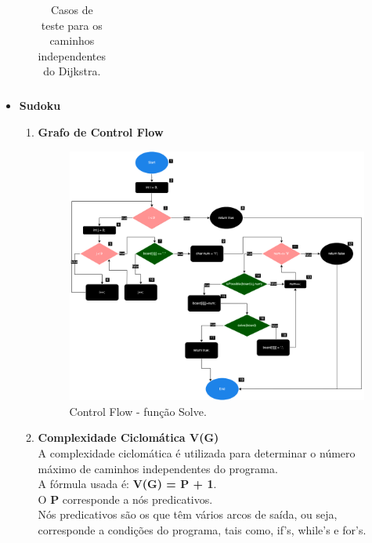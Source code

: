 \documentclass{article}
\begin{document}
\begin{itemize}
\begin{enumerate}
\begin{table}[H]
\begin{tabular}{|c|p{7cm}|p{3cm}|}
    \end{tabular}
    \caption{Casos de teste para os caminhos independentes do Dijkstra.}
    \label{tab:tabela_exemplo}
\end{table}


  
  

\end{enumerate}
\item \textbf{Sudoku}
\begin{enumerate}
    \item \textbf{Grafo de Control Flow}\\
    \begin{figure}[H]
        \centering
        \includegraphics[width=\textwidth]{Images/ControlFlowSudoku.png}
        \caption{Control Flow - função Solve.} 
        \label{fig:ControlFlow-Sudoku}
    \end{figure}
    \item \textbf{Complexidade Ciclomática V(G)}\\
    
    \quad A complexidade ciclomática é utilizada para determinar o número máximo de caminhos independentes do programa.\\
    \quad A fórmula usada é: \textbf{V(G) = P + 1}.\\
  
    O \textbf{P} corresponde a nós predicativos.\\
  
    Nós predicativos são os que têm vários arcos de saída, ou seja, corresponde a condições do programa, tais como, if's, while's e for's.
  

\end{enumerate}
\end{itemize}
\end{document}
